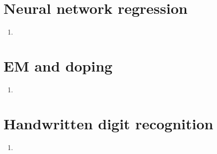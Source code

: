 \documentclass[a4paper,10pt]{article}
\numberwithin{equation}{section} %
\numberwithin{figure}{section} %
\numberwithin{table}{section} %
\theoremstyle{mytheor}
\begin{document}
\vfill 

\section{Neural network regression}
\begin{enumerate}
	\item 
\end{enumerate}

\vfill

\section{EM and doping}
\begin{enumerate}
	\item 
\end{enumerate}

\vfill

\section{Handwritten digit recognition}
\begin{enumerate}
	\item
\end{enumerate}
\end{document}
